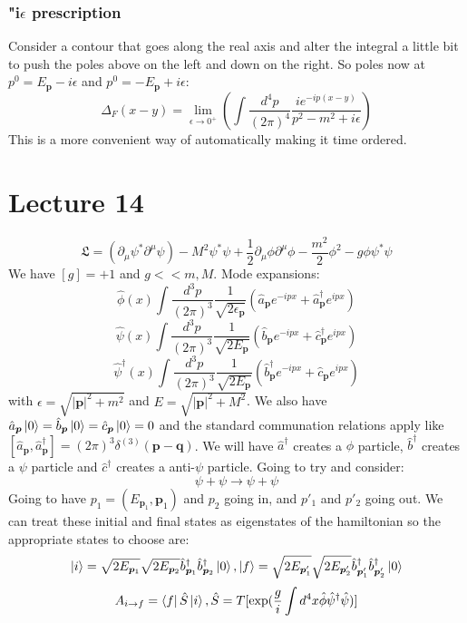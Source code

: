 \documentclass[12pt, a4paper, twoside, titlepage]{article}
\begin{document}
\subsubsection{"i$\epsilon$ prescription}
Consider a contour that goes along the real axis and alter the integral a little bit to push the poles above on the left and down on the right. So poles now at $p^0 = E_{\bm p} - i \epsilon$ and $p^0 = - E_{\bm p} + i \epsilon$:
$$
\Delta_F(x-y) = \lim_{\epsilon\rightarrow 0^+} ( \int \frac{d^4 p}{(2\pi)^4} \frac{i e^{-i p(x-y)}}{ p^2 - m^2 + i \epsilon})
$$
This is a more convenient way of automatically making it time ordered.
\section{Lecture 14}
$$
\mathfrak{L} = (\partial_{\mu}\psi^* \partial^{\mu} \psi) - M^2 \psi^* \psi + \frac{1}{2} \partial_{\mu} \phi \partial ^{\mu} \phi - \frac{m^2}{2} \phi^2 - g \phi\psi^* \psi
$$
We have $[g] = +1$ and $g << m, M$. Mode expansions:
$$
\hat \phi(x) \int \frac{d^3 p}{(2\pi)^3 } \frac{1}{\sqrt{2 \epsilon_{\bm p}}} (\hat a_{\bm p} e^{- i p x} + \hat a^{\dagger}_{\bm p} e^{i p x})
$$
$$
\hat \psi(x) \int \frac{d^3 p}{(2\pi)^3 } \frac{1}{\sqrt{2 E_{\bm p}}} (\hat b_{\bm p} e^{- i p x} + \hat c^{\dagger}_{\bm p} e^{i p x})
$$
$$
\hat \psi^{\dagger}(x) \int \frac{d^3 p}{(2\pi)^3 } \frac{1}{\sqrt{2 E_{\bm p}}} (\hat b^{\dagger}_{\bm p} e^{- i p x} + \hat c_{\bm p} e^{i p x})
$$
with $\epsilon = \sqrt{|\bm p|^2 + m^2}$ and $E = \sqrt{|\bm p|^2 + M^2}$. We also have $\hat a_{\bm p} \ket{0} = \hat b_{\bm p} \ket{0} = \hat c_{\bm p} \ket{0} = 0$ and the standard communation relations apply like $[\hat a_{\bm p}, \hat a^{\dagger}_{\bm p}] = (2\pi)^3 \delta^{(3)}(\bm p - \bm q)$. We will have $\hat a^{\dagger}$ creates a $\phi$ particle, $\hat b^{\dagger}$ creates a $\psi$ particle and $\hat c^{\dagger}$ creates a anti-$\psi$ particle. Going to try and consider:
$$
\psi+ \psi \rightarrow \psi + \psi
$$
Going to have $p_1 = (E_{\bm p_1}, \bm p_1)$ and $p_2$ going in, and $p'_1$ and $p'_2$ going out. We can treat these initial and final states as eigenstates of the hamiltonian so the appropriate states to choose are:
$$
\ket{i} = \sqrt{2 E_{\bm p_1}} \sqrt{2 E_{\bm p_2}} \hat b_{\bm p_1}^{\dagger} \hat b_{\bm p_2}^{\dagger} \ket{0}, \ket{f} = \sqrt{2 E_{\bm p'_1}} \sqrt{2 E_{\bm p'_2}} \hat b_{\bm p'_1}^{\dagger} \hat b_{\bm p'_2}^{\dagger} \ket{0}
$$
$$
A_{i \rightarrow f} = \bra{f} \hat S \ket{i}, \hat S = T[ \exp(\frac{g}{i} \int d^4 x \hat \phi \hat \psi^{\dagger} \hat \psi)]
$$
\end{document}
